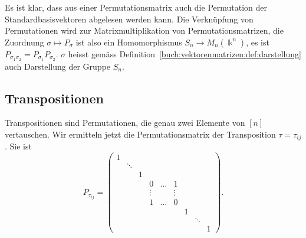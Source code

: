 Es ist klar, dass aus einer Permutationsmatrix auch die Permutation
der Standardbasisvektoren abgelesen werden kann.
%
Die Verknüpfung von Permutationen wird zur Matrixmultiplikation
%
von Permutationsmatrizen, die Zuordnung $\sigma\mapsto P_\sigma$
ist also ein Homomorphismus
%
$S_n \to M_n(\Bbbk^n)$,
es ist
$P_{\sigma_1\sigma_2}=P_{\sigma_1}P_{\sigma_2}$.
$\sigma$ heisst gemäss Definition~\ref{buch:vektorenmatrizen:def:darstellung}
auch Darstellung der Gruppe $S_n$.
%

\subsection{Transpositionen}
Transpositionen sind Permutationen, die genau zwei Elemente von $[n]$
vertauschen.
Wir ermitteln jetzt die Permutationsmatrix der Transposition $\tau=\tau_{i\!j}$.
Sie ist
\[
P_{\tau_{i\!j}}
=
\begin{pmatrix}
1&      & &      &     &      & &      & \\
 &\ddots& &      &     &      & &      & \\
 &      &1&      &     &      & &      & \\
 &      & &0     &\dots&1     & &      & \\
 &      & &\vdots&     &\vdots& &      & \\
 &      & &1     &\dots&0     & &      & \\
 &      & &      &     &      &1&      & \\
 &      & &      &     &      & &\ddots& \\
 &      & &      &     &      & &      &1
\end{pmatrix}.
\]

